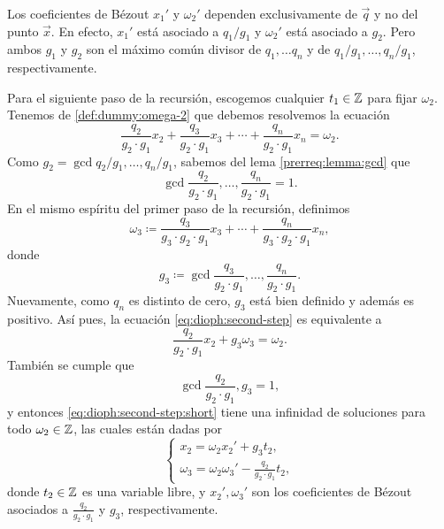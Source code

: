 \begin{observation}
	Los coeficientes de Bézout $x_1'$ y $\omega_2'$ dependen exclusivamente de $\vec{q}$ y no del
	punto $\vec{x}$. En efecto, $x_1'$ está asociado a $q_1/g_1$ y $\omega_2'$ está asociado a
	$g_2$. Pero ambos $g_1$ y $g_2$ son el máximo común divisor de $q_1, \ldots q_n$ y de
	$q_1/g_1, \ldots, q_n/g_1$, respectivamente. 
\end{observation}

Para el siguiente paso de la recursión, escogemos cualquier $t_1 \in \mathbb{Z}$ para fijar $\omega_2$.
Tenemos de \eqref{def:dummy:omega-2} que debemos resolvemos la ecuación
\begin{equation}
	\label{eq:dioph:second-step}
	\frac{q_2}{g_2 \cdot g_1}x_2 +
	\frac{q_3}{g_2 \cdot g_1}x_3 +
	\cdots +
	\frac{q_n}{g_2 \cdot g_1}x_n
	= \omega_2.
\end{equation}
Como $g_2 = \gcd{q_2/g_1, \ldots, q_n/g_1}$, sabemos del lema \ref{prerreq:lemma:gcd}
que
\begin{equation*}
	\gcd{\frac{q_2}{g_2 \cdot g_1}, \ldots, \frac{q_n}{g_2 \cdot g_1}} = 1.
\end{equation*}
En el mismo espíritu del primer paso de la recursión, definimos
\begin{equation*}
	\omega_3 \coloneq \frac{q_3}{g_3 \cdot g_2 \cdot g_1}x_3 + \cdots + \frac{q_n}{g_3
	\cdot g_2 \cdot g_1}x_n,
\end{equation*}
donde
\begin{equation*}
	g_3 \coloneq  \gcd{\frac{q_3}{g_2 \cdot g_1}, \ldots, \frac{q_n}{g_2 \cdot g_1}}.
\end{equation*}
Nuevamente, como $q_n$ es distinto de cero, $g_3$ está bien definido y además es positivo. Así pues,
la ecuación \eqref{eq:dioph:second-step} es equivalente a
\begin{equation}
	\label{eq:dioph:second-step:short}
	\frac{q_2}{g_2 \cdot g_1}x_2 + g_3\omega_3 = \omega_2.
\end{equation}
También se cumple que
\begin{equation*}
	\gcd{\frac{q_2}{g_2 \cdot g_1}, g_3} = 1,
\end{equation*}
y entonces \eqref{eq:dioph:second-step:short} tiene una infinidad de soluciones para todo $\omega_2 \in
\mathbb{Z}$, las cuales están dadas por
\begin{equation*}
	\begin{cases}
		x_2 = \omega_2x_2' + g_3t_2, \\
		\omega_3 = \omega_2\omega_3' - \frac{q_2}{g_2 \cdot g_1}t_2,
	\end{cases}
\end{equation*}
donde $t_2 \in \mathbb{Z}$ es una variable libre, y $x_2', \omega_3'$ son los coeficientes de Bézout
asociados a $\frac{q_2}{g_2 \cdot g_1}$ y $g_3$, respectivamente.

